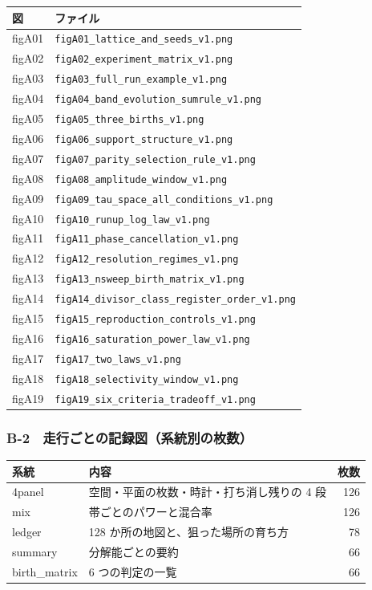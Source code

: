 \documentclass[
]{ltjsarticle}
\newcounter{none} %
\begin{document}
{\def\LTcaptype{none} %
\begin{longtable}[]{@{}ll@{}}
\toprule\noalign{}
図 & ファイル \\
\midrule\noalign{}
\endhead
\bottomrule\noalign{}
\endlastfoot
figA01 & \texttt{figA01\_lattice\_and\_seeds\_v1.png} \\
figA02 & \texttt{figA02\_experiment\_matrix\_v1.png} \\
figA03 & \texttt{figA03\_full\_run\_example\_v1.png} \\
figA04 & \texttt{figA04\_band\_evolution\_sumrule\_v1.png} \\
figA05 & \texttt{figA05\_three\_births\_v1.png} \\
figA06 & \texttt{figA06\_support\_structure\_v1.png} \\
figA07 & \texttt{figA07\_parity\_selection\_rule\_v1.png} \\
figA08 & \texttt{figA08\_amplitude\_window\_v1.png} \\
figA09 & \texttt{figA09\_tau\_space\_all\_conditions\_v1.png} \\
figA10 & \texttt{figA10\_runup\_log\_law\_v1.png} \\
figA11 & \texttt{figA11\_phase\_cancellation\_v1.png} \\
figA12 & \texttt{figA12\_resolution\_regimes\_v1.png} \\
figA13 & \texttt{figA13\_nsweep\_birth\_matrix\_v1.png} \\
figA14 & \texttt{figA14\_divisor\_class\_register\_order\_v1.png} \\
figA15 & \texttt{figA15\_reproduction\_controls\_v1.png} \\
figA16 & \texttt{figA16\_saturation\_power\_law\_v1.png} \\
figA17 & \texttt{figA17\_two\_laws\_v1.png} \\
figA18 & \texttt{figA18\_selectivity\_window\_v1.png} \\
figA19 & \texttt{figA19\_six\_criteria\_tradeoff\_v1.png} \\
\end{longtable}
}

\subsubsection{B-2　走行ごとの記録図（系統別の枚数）}\label{b-2-ux8d70ux884cux3054ux3068ux306eux8a18ux9332ux56f3ux7cfbux7d71ux5225ux306eux679aux6570}

{\def\LTcaptype{none} %
\begin{longtable}[]{@{}llr@{}}
\toprule\noalign{}
系統 & 内容 & 枚数 \\
\midrule\noalign{}
\endhead
\bottomrule\noalign{}
\endlastfoot
4panel & 空間・平面の枚数・時計・打ち消し残りの 4 段 & 126 \\
mix & 帯ごとのパワーと混合率 & 126 \\
ledger & 128 か所の地図と、狙った場所の育ち方 & 78 \\
summary & 分解能ごとの要約 & 66 \\
birth\_matrix & 6 つの判定の一覧 & 66 \\
\end{longtable}
}
\end{document}
